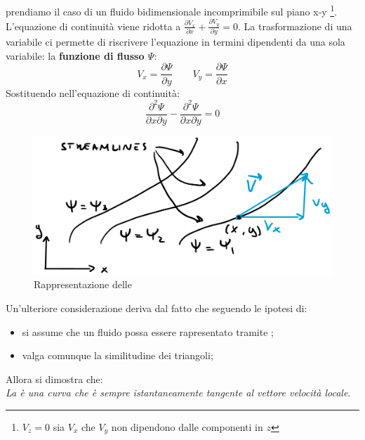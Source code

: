 prendiamo il caso di un fluido bidimensionale incomprimibile sul piano x-y%
\footnote{$V_z = 0$ sia $V_x$ che $V_y$ non dipendono dalle componenti in $z$}.
L'equazione di continuità viene ridotta a $\frac{\partial V_x}{\partial x} + \frac{\partial V_y}{\partial y} = 0$.
La trasformazione di una variabile ci permette di riscrivere l'equazione in termini dipendenti da una sola variabile: la \textbf{funzione di flusso $\Psi$}:
\begin{equation}
V_x = \frac{\partial \Psi}{\partial y} \qquad V_y = \frac{\partial \Psi}{\partial x}
\label{eqn:CambioVar}
\end{equation} 
Sostituendo nell'equazione di continuità:
\begin{equation}
\frac{\partial^2 \Psi}{\partial x \partial y} - \frac{\partial^2 \Psi}{\partial x \partial y} = 0
\label{eqn:StreamFunction}
\end{equation}

\begin{figure}
\centering
\includegraphics[width = \textwidth]{gfx/Streamlines}
\caption{Rappresentazione delle }
\label{fig:Streamlines}
\end{figure}

Un'ulteriore considerazione deriva dal fatto che seguendo le ipotesi di:
\begin{itemize}
\item si assume che un fluido possa essere rapresentato tramite ;
\item valga comunque la similitudine dei triangoli;
\end{itemize}
Allora si dimostra che:\\
\textit{La  è una curva che è sempre istantaneamente tangente al vettore velocità locale}.

